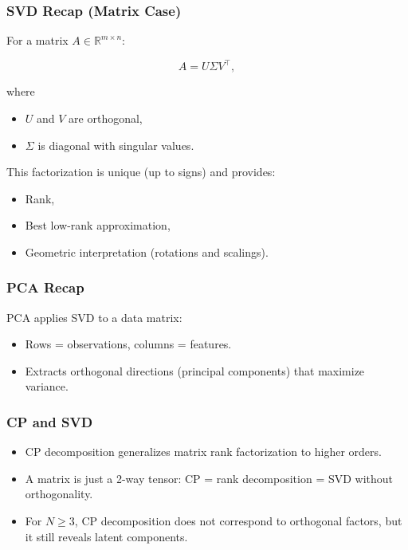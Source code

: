 \documentclass[
  letterpaper,
  DIV=11,
  numbers=noendperiod]{scrreprt}
\providecommand{\tightlist}{%
  \setlength{\itemsep}{0pt}\setlength{\parskip}{0pt}}
\begin{document}
\subsubsection{SVD Recap (Matrix Case)}\label{svd-recap-matrix-case}

For a matrix \(A \in \mathbb{R}^{m \times n}\):

\[
A = U \Sigma V^\top,
\]

where

\begin{itemize}
\tightlist
\item
  \(U\) and \(V\) are orthogonal,
\item
  \(\Sigma\) is diagonal with singular values.
\end{itemize}

This factorization is unique (up to signs) and provides:

\begin{itemize}
\tightlist
\item
  Rank,
\item
  Best low-rank approximation,
\item
  Geometric interpretation (rotations and scalings).
\end{itemize}

\subsubsection{PCA Recap}\label{pca-recap}

PCA applies SVD to a data matrix:

\begin{itemize}
\tightlist
\item
  Rows = observations, columns = features.
\item
  Extracts orthogonal directions (principal components) that maximize
  variance.
\end{itemize}

\subsubsection{CP and SVD}\label{cp-and-svd}

\begin{itemize}
\tightlist
\item
  CP decomposition generalizes matrix rank factorization to higher
  orders.
\item
  A matrix is just a 2-way tensor: CP = rank decomposition = SVD without
  orthogonality.
\item
  For \(N \geq 3\), CP decomposition does not correspond to orthogonal
  factors, but it still reveals latent components.
\end{itemize}
\end{document}
